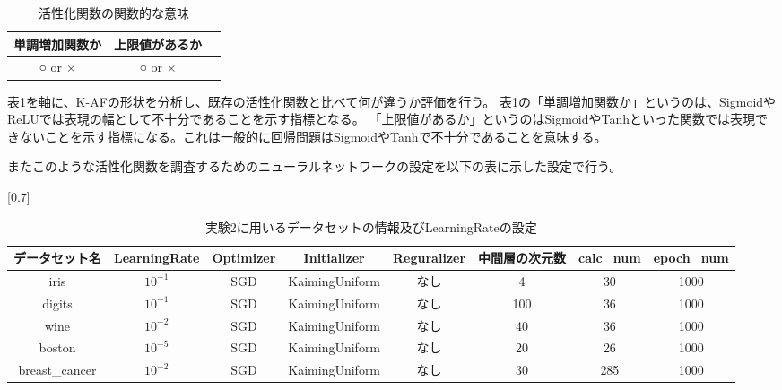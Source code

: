 \begin{table}[htbp]
    \begin{center}
        \caption{活性化関数の関数的な意味}
        \label{af-class}
        \vspace{2mm} 
        \begin{tabular}{ |c|c|c| }
        \hline
        単調増加関数か & 上限値があるか   \\
        \hline
        ○ or × & ○ or ×  \\
        \hline
        \end{tabular}
    \end{center}
\end{table}


表\ref{af-class}を軸に、K-AFの形状を分析し、既存の活性化関数と比べて何が違うか評価を行う。
表\ref{af-class}の「単調増加関数か」というのは、SigmoidやReLUでは表現の幅として不十分であることを示す指標となる。
「上限値があるか」というのはSigmoidやTanhといった関数では表現できないことを示す指標になる。これは一般的に回帰問題はSigmoidやTanhで不十分であることを意味する。


またこのような活性化関数を調査するためのニューラルネットワークの設定を以下の表に示した設定で行う。
\begin{table}[htbp]
    \begin{center}
        \caption{実験2に用いるデータセットの情報及びLearningRateの設定}
        \label{dataset_name2}
        \vspace{2mm} 

        \scalebox{0.7}[0.7]{
            \begin{tabular}{ |c|c|c|c|c|c|c|c| }
            \hline
            データセット名 & LearningRate & Optimizer & Initializer & Reguralizer & 中間層の次元数 & calc\_num & epoch\_num \\
            \hline
            iris           & $ 10^{-1} $    & SGD         & KaimingUniform        & なし      & 4 & 30 & 1000 \\
            \hline
            digits         & $ 10^{-1} $    & SGD         & KaimingUniform       & なし      & 100 & 36 & 1000 \\
            \hline
            wine           & $ 10^{-2} $    & SGD         & KaimingUniform       & なし      & 40 & 36 & 1000 \\
            \hline
            boston         & $ 10^{-5} $    & SGD        & KaimingUniform        & なし      & 20 & 26 & 1000 \\
            \hline
            breast\_cancer & $ 10^{-2} $    & SGD        & KaimingUniform        & なし      & 30 & 285 & 1000 \\
            \hline
            \end{tabular}
        }
    \end{center}
\end{table}

